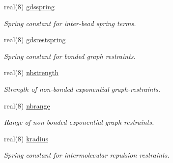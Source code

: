 \begin{DoxyCompactItemize}
\mbox{\label{namespaceglobaldata_af1f7f0ba68e55ccb1158169eef25c3e5}} 
real(8) \mbox{\hyperlink{namespaceglobaldata_af1f7f0ba68e55ccb1158169eef25c3e5}{gdsspring}}
\begin{DoxyCompactList}\small\item\em Spring constant for inter-\/bead spring terms. \end{DoxyCompactList}\item 
\mbox{\label{namespaceglobaldata_ad9253180f5cdc09fd151e1cbf7ba194c}} 
real(8) \mbox{\hyperlink{namespaceglobaldata_ad9253180f5cdc09fd151e1cbf7ba194c}{gdsrestspring}}
\begin{DoxyCompactList}\small\item\em Spring constant for bonded graph restraints. \end{DoxyCompactList}\item 
\mbox{\label{namespaceglobaldata_a58f14ebf87fc81496e6d2eb8788221e4}} 
real(8) \mbox{\hyperlink{namespaceglobaldata_a58f14ebf87fc81496e6d2eb8788221e4}{nbstrength}}
\begin{DoxyCompactList}\small\item\em Strength of non-\/bonded exponential graph-\/restraints. \end{DoxyCompactList}\item 
\mbox{\label{namespaceglobaldata_af51080d263e3202c72512026f13bca07}} 
real(8) \mbox{\hyperlink{namespaceglobaldata_af51080d263e3202c72512026f13bca07}{nbrange}}
\begin{DoxyCompactList}\small\item\em Range of non-\/bonded exponential graph-\/restraints. \end{DoxyCompactList}\item 
\mbox{\label{namespaceglobaldata_ae0ab8dd71eb4a5f9ec3cffdc69a4d2b7}} 
real(8) \mbox{\hyperlink{namespaceglobaldata_ae0ab8dd71eb4a5f9ec3cffdc69a4d2b7}{kradius}}
\begin{DoxyCompactList}\small\item\em Spring constant for intermolecular repulsion restraints. \end{DoxyCompactList}\item 
\mbox{\label{namespaceglobaldata_a31f5739ae1cbd76deff375eb7de1f132}} 

\end{DoxyCompactItemize}
